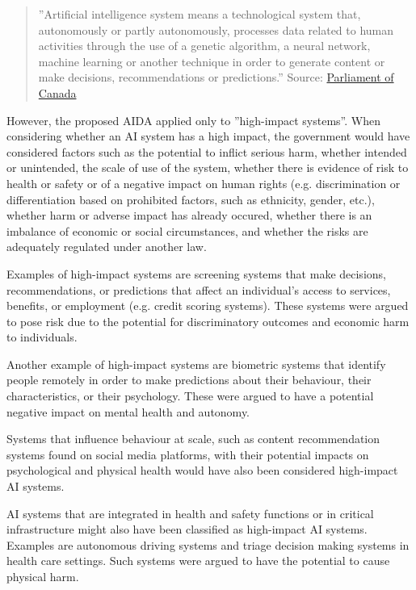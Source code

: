\begin{advanced}
\begin{quote}''Artificial intelligence system means a technological system that, autonomously or partly autonomously, processes data related to human activities through the use of a genetic algorithm, a neural network, machine learning or another technique in order to generate content or make decisions, recommendations or predictions.'' \footnotesize Source: \href{https://www.parl.ca/legisinfo/en/bill/44-1/c-27}{Parliament of Canada} \normalsize \end{quote}

However, the proposed AIDA applied only to ''high-impact systems''. When considering whether an AI system has a high impact, the government would have considered factors such as the potential to inflict serious harm, whether intended or unintended, the scale of use of the system, whether there is evidence of risk to health or safety or of a negative impact on human rights (e.g. discrimination or differentiation based on prohibited factors, such as ethnicity, gender, etc.), whether harm or adverse impact has already occured, whether there is an imbalance of economic or social circumstances, and whether the risks are adequately regulated under another law. 

Examples of high-impact systems are screening systems that make decisions, recommendations, or predictions that affect an individual's access to services, benefits, or employment (e.g. credit scoring systems). These systems were argued to pose risk due to the potential for discriminatory outcomes and economic harm to individuals. 

Another example of high-impact systems are biometric systems that identify people remotely in order to make predictions about their behaviour, their characteristics, or their psychology. These were argued to have a potential negative impact on mental health and autonomy. 

Systems that influence behaviour at scale, such as content recommendation systems found on social media platforms, with their potential impacts on psychological and physical health would have also been considered high-impact AI systems. 

AI systems that are integrated in health and safety functions or in critical infrastructure might also have been classified as high-impact AI systems. Examples are autonomous driving systems and triage decision making systems in health care settings. Such systems were argued to have the potential to cause physical harm. 


\end{advanced}
